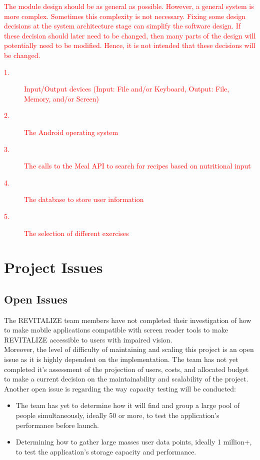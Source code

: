 \documentclass[12pt,letterpaper]{article}
\begin{document}
\textcolor{red}{The module design should be as general as possible. However, a general system is
more complex. Sometimes this complexity is not necessary. Fixing some design
decisions at the system architecture stage can simplify the software design. If
these decision should later need to be changed, then many parts of the design
will potentially need to be modified. Hence, it is not intended that these
decisions will be changed.}

\begin{description}
\item[\textcolor{red}{1.}] \textcolor{red}{Input/Output devices
(Input: File and/or Keyboard, Output: File, Memory, and/or Screen)}
\item[\textcolor{red}{2.}] \textcolor{red}{The Android operating system}
\item[\textcolor{red}{3.}] \textcolor{red}{The calls to the Meal API to search for recipes based on nutritional input}
\item[\textcolor{red}{4.}] \textcolor{red}{The database to store user information}
\item[\textcolor{red}{5.}] \textcolor{red}{The selection of different exercises}
\end{description}


\section{Project Issues}

\subsection{Open Issues}
The REVITALIZE team members have not completed their investigation of how to make mobile applications compatible with screen reader tools to make REVITALIZE accessible to users with impaired vision.\\

Moreover, the level of difficulty of maintaining and scaling this project is an open issue as it is highly dependent on the implementation. The team has not yet completed it's assessment of the projection of users, costs, and allocated budget to make a current decision on the maintainability and scalability of the project.\\

Another open issue is regarding the way capacity testing will be conducted:
\begin{itemize}
	\item The team has yet to determine how it will find and group a large pool of people simultaneously, ideally 50 or more, to test the application's performance before launch.
	\item Determining how to gather large masses user data points, ideally 1 million+, to test the application's storage capacity and performance.
\end{itemize}
\end{document}
